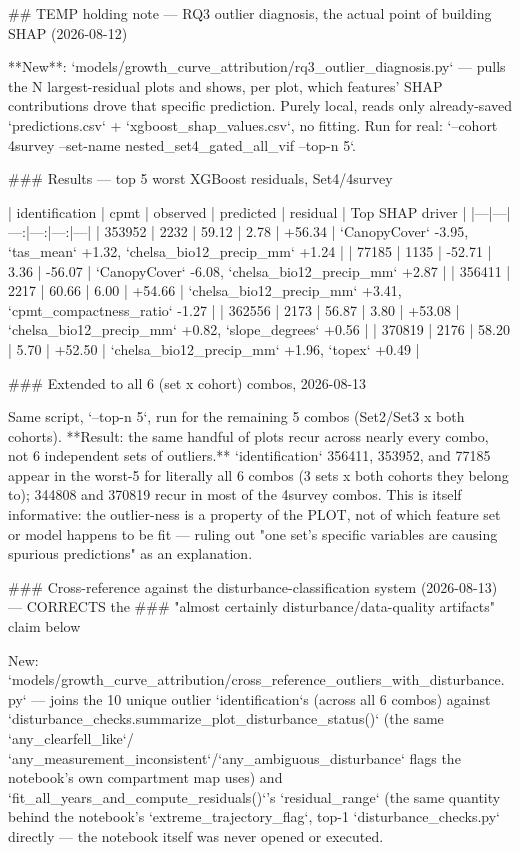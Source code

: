 ## TEMP holding note — RQ3 outlier diagnosis, the actual point of building SHAP (2026-08-12)

**New**: `models/growth_curve_attribution/rq3_outlier_diagnosis.py` — pulls the N largest-residual
plots and shows, per plot, which features' SHAP contributions drove that specific prediction.
Purely local, reads only already-saved `predictions.csv` + `xgboost_shap_values.csv`, no fitting.
Run for real: `--cohort 4survey --set-name nested_set4_gated_all_vif --top-n 5`.

### Results — top 5 worst XGBoost residuals, Set4/4survey

| identification | cpmt | observed | predicted | residual | Top SHAP driver |
|---|---|---:|---:|---:|---|
| 353952 | 2232 | 59.12 | 2.78 | +56.34 | `CanopyCover` -3.95, `tas_mean` +1.32, `chelsa_bio12_precip_mm` +1.24 |
| 77185 | 1135 | -52.71 | 3.36 | -56.07 | `CanopyCover` -6.08, `chelsa_bio12_precip_mm` +2.87 |
| 356411 | 2217 | 60.66 | 6.00 | +54.66 | `chelsa_bio12_precip_mm` +3.41, `cpmt_compactness_ratio` -1.27 |
| 362556 | 2173 | 56.87 | 3.80 | +53.08 | `chelsa_bio12_precip_mm` +0.82, `slope_degrees` +0.56 |
| 370819 | 2176 | 58.20 | 5.70 | +52.50 | `chelsa_bio12_precip_mm` +1.96, `topex` +0.49 |

### Extended to all 6 (set x cohort) combos, 2026-08-13

Same script, `--top-n 5`, run for the remaining 5 combos (Set2/Set3 x both cohorts). **Result: the
same handful of plots recur across nearly every combo, not 6 independent sets of outliers.**
`identification` 356411, 353952, and 77185 appear in the worst-5 for literally all 6 combos
(3 sets x both cohorts they belong to); 344808 and 370819 recur in most of the 4survey combos.
This is itself informative: the outlier-ness is a property of the PLOT, not of which feature set
or model happens to be fit — ruling out "one set's specific variables are causing spurious
predictions" as an explanation.

### Cross-reference against the disturbance-classification system (2026-08-13) — CORRECTS the
### "almost certainly disturbance/data-quality artifacts" claim below

New: `models/growth_curve_attribution/cross_reference_outliers_with_disturbance.py` — joins the
10 unique outlier `identification`s (across all 6 combos) against
`disturbance_checks.summarize_plot_disturbance_status()` (the same `any_clearfell_like`/
`any_measurement_inconsistent`/`any_ambiguous_disturbance` flags the notebook's own compartment
map uses) and `fit_all_years_and_compute_residuals()`'s `residual_range` (the same quantity behind
the notebook's `extreme_trajectory_flag`, top-1%
`disturbance_checks.py` directly — the notebook itself was never opened or executed.

